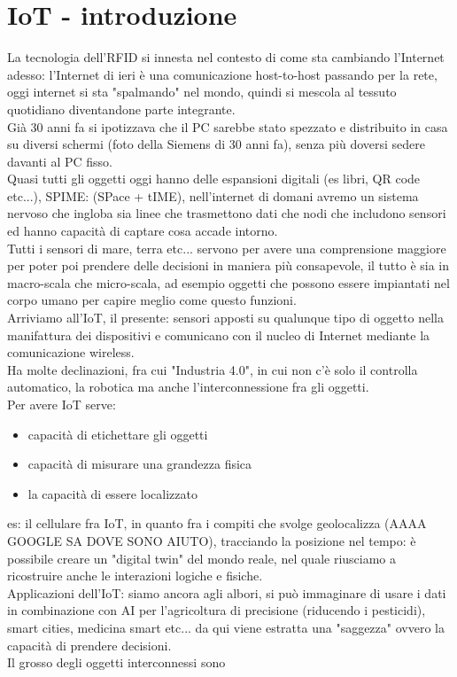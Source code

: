 \documentclass[oneside, 12pt]{extbook}
\begin{document}
\section{IoT - introduzione}
La tecnologia dell'RFID si innesta nel contesto di come sta cambiando l'Internet adesso: l'Internet di ieri è una comunicazione host-to-host passando per la rete, oggi internet si sta "spalmando" nel mondo, quindi si mescola al tessuto quotidiano diventandone parte integrante.\\Già 30 anni fa si ipotizzava che il PC sarebbe stato spezzato e distribuito in casa su diversi schermi (foto della Siemens di 30 anni fa), senza più doversi sedere davanti al PC fisso.\\Quasi tutti gli oggetti oggi hanno delle espansioni digitali (es libri, QR code etc...), SPIME: (SPace + tIME), nell'internet di domani avremo un sistema nervoso che ingloba sia linee che trasmettono dati che nodi che includono sensori ed hanno capacità di captare cosa accade intorno.\\Tutti i sensori di mare, terra etc... servono per avere una comprensione maggiore per poter poi prendere delle decisioni in maniera più consapevole, il tutto è sia in macro-scala che micro-scala, ad esempio oggetti che possono essere impiantati nel corpo umano per capire meglio come questo funzioni.\\Arriviamo all'IoT, il presente: sensori apposti su qualunque tipo di oggetto nella manifattura dei dispositivi e comunicano con il nucleo di Internet mediante la comunicazione wireless.\\Ha molte declinazioni, fra cui "Industria 4.0", in cui non c'è solo il controlla automatico, la robotica ma anche l'interconnessione fra gli oggetti.\\Per avere IoT serve:
\begin{itemize}
	\item capacità di etichettare gli oggetti
	\item capacità di misurare una grandezza fisica
	\item la capacità di essere localizzato
\end{itemize}
es: il cellulare fra IoT, in quanto fra i compiti che svolge geolocalizza (AAAA GOOGLE SA DOVE SONO AIUTO), tracciando la posizione nel tempo: è possibile creare un "digital twin" del mondo reale, nel quale riusciamo a ricostruire anche le interazioni logiche e fisiche.\\Applicazioni dell'IoT: siamo ancora agli albori, si può immaginare di usare i dati in combinazione con AI per l'agricoltura di precisione (riducendo i pesticidi), smart cities, medicina smart etc... da qui viene estratta una "saggezza" ovvero la capacità di prendere decisioni.\\Il grosso degli oggetti interconnessi sono
\end{document}
